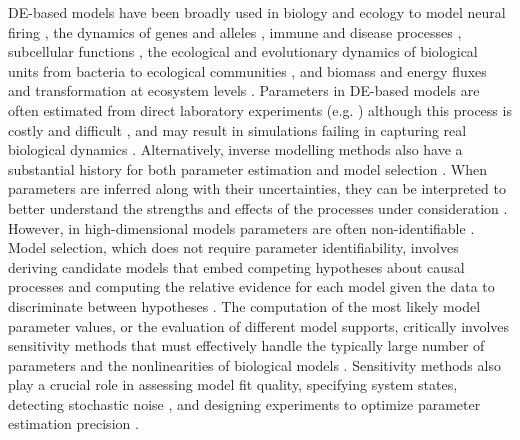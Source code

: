 DE-based models have been broadly used in biology and ecology to model neural firing \cite{hodgkin1952quantitative}, the dynamics of genes and alleles \cite{Page2002}, immune and disease processes \cite{colijn2006high}, subcellular functions \cite{brown2003statistical}, the ecological and evolutionary dynamics of biological units from bacteria to ecological communities \cite{Gabor2015, Lion2018, Villa2021, Boussange2022, boussange2023a, Akesson2021, chalmandrier2021, VandenBerg2022}, and biomass and energy fluxes and transformation at ecosystem levels \cite{Weng2015, Schartau2017, Franklin2020, Geary2020}.
Parameters in DE-based models are often estimated from direct laboratory experiments (e.g. \cite{hodgkin1952quantitative}) although this process is costly and difficult \cite{Schartau2017}, and may result in simulations failing in capturing real biological dynamics \cite{Watts2001}. 
Alternatively, inverse modelling methods also have a substantial history for both parameter estimation \cite{ramsay2007parameter,ramsay2017dynamic,Schartau2017,ding2000h,fussmann2000crossing} and model selection \cite{Johnson2004,zhang2015selection,alsos2023,pantel2023}.
When parameters are inferred along with their uncertainties, they can be interpreted to better understand the strengths and effects of the processes under consideration \cite{Pontarp2019, Higgins2010, Curtsdotter2019, godwin2020}. 
However, in high-dimensional models parameters are often non-identifiable \cite{transtrum2011geometry}. 
Model selection, which does not require parameter identifiability, involves deriving candidate models that embed competing hypotheses about causal processes and computing the relative evidence for each model given the data to discriminate between hypotheses \cite{Johnson2004, alsos2023}.
The computation of the most likely model parameter values, or the evaluation of different model supports, critically involves sensitivity methods that must effectively handle the typically large number of parameters and the nonlinearities of biological models \cite{transtrum2011geometry, Gabor2015}.
Sensitivity methods also play a crucial role in assessing model fit quality, specifying system states, detecting stochastic noise \cite{hooker2009forcing, hooker2015goodness, liu2023specification}, and designing experiments to optimize parameter estimation precision \cite{bauer2000numerical}.

